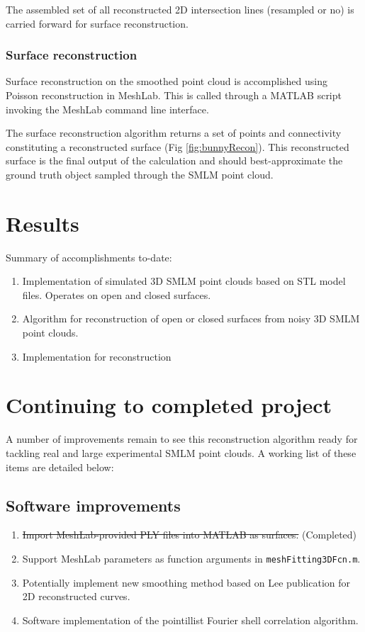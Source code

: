 \documentclass[10pt,a4paper]{article}
\begin{document}
The assembled set of all reconstructed 2D intersection lines (resampled or no) is carried forward for surface reconstruction.


\subsubsection{Surface reconstruction}

Surface reconstruction on the smoothed point cloud is accomplished using Poisson reconstruction \cite{kazhdan2006poisson} in MeshLab.  This is called through a MATLAB script invoking the MeshLab command line interface. 

The surface reconstruction algorithm returns a set of points and connectivity constituting a reconstructed surface (Fig \ref{fig:bunnyRecon}).  This reconstructed surface is the final output of the calculation and should best-approximate the ground truth object sampled through the SMLM point cloud. 

\section{Results}

Summary of accomplishments to-date:
\begin{enumerate}
	\item Implementation of simulated 3D SMLM point clouds based on STL model files.  Operates on open and closed surfaces.
	\item Algorithm for reconstruction of open or closed surfaces from noisy 3D SMLM point clouds.
	\item Implementation for reconstruction 
\end{enumerate}



\section{Continuing to completed project}

A number of improvements remain to see this reconstruction algorithm ready for tackling real and large experimental SMLM point clouds. A working list of these items are detailed below:

\subsection{Software improvements}
\begin{enumerate}
	\item \sout{Import MeshLab-provided PLY files into MATLAB as surfaces.} (Completed)
	\item Support MeshLab parameters as function arguments in \texttt{meshFitting3DFcn.m}.
	\item Potentially implement new smoothing method based on Lee publication for 2D reconstructed curves.
	\item Software implementation of the pointillist Fourier shell correlation algorithm. 
\end{enumerate}
\end{document}
